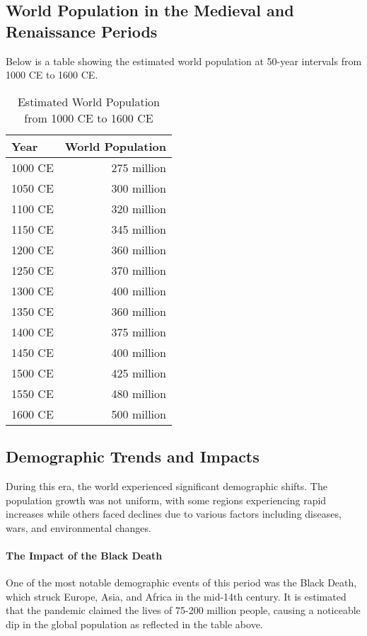 \documentclass[a4paper,12pt]{book}
\begin{document}
\subsection*{World Population in the Medieval and Renaissance Periods}
Below is a table showing the estimated world population at 50-year intervals from 1000 CE to 1600 CE.

\begin{table}[h!]
\centering
\begin{tabular}{|l|r|}
\hline
Year & World Population \\
\hline
1000 CE & 275 million \\
1050 CE & 300 million \\
1100 CE & 320 million \\
1150 CE & 345 million \\
1200 CE & 360 million \\
1250 CE & 370 million \\
1300 CE & 400 million \\
1350 CE & 360 million \\ %
1400 CE & 375 million \\
1450 CE & 400 million \\
1500 CE & 425 million \\
1550 CE & 480 million \\
1600 CE & 500 million \\
\hline
\end{tabular}
\caption{Estimated World Population from 1000 CE to 1600 CE}
\label{tab:world_population_1000_1600}
\end{table}

\subsection*{Demographic Trends and Impacts}
During this era, the world experienced significant demographic shifts. The population growth was not uniform, with some regions experiencing rapid increases while others faced declines due to various factors including diseases, wars, and environmental changes.

\paragraph{The Impact of the Black Death}
One of the most notable demographic events of this period was the Black Death, which struck Europe, Asia, and Africa in the mid-14th century. It is estimated that the pandemic claimed the lives of 75-200 million people, causing a noticeable dip in the global population as reflected in the table above.
\end{document}
